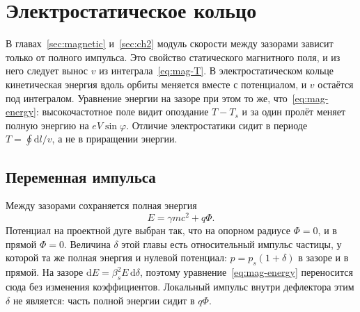 \section{Электростатическое кольцо}
\label{sec:electrostatic}

В главах~\ref{sec:magnetic} и~\ref{sec:ch2} модуль скорости между зазорами зависит только от полного импульса. Это свойство статического магнитного поля, и из него следует вынос $v$ из интеграла~\eqref{eq:mag-T}. В электростатическом кольце кинетическая энергия вдоль орбиты меняется вместе с потенциалом, и $v$ остаётся под интегралом. Уравнение энергии на зазоре при этом то же, что~\eqref{eq:mag-energy}: высокочастотное поле видит опоздание $T-T_s$ и за один пролёт меняет полную энергию на $eV\sin\varphi$. Отличие электростатики сидит в периоде $T=\oint\mathrm{d}l/v$, а не в приращении энергии.

\subsection{Переменная импульса}
\label{sec:es-delta}

Между зазорами сохраняется полная энергия
\begin{equation}
\label{eq:es-energy}
E=\gamma mc^2+q\Phi.
\end{equation}
Потенциал на проектной дуге выбран так, что на опорном радиусе $\Phi=0$, и в прямой $\Phi=0$. Величина $\delta$ этой главы есть относительный импульс частицы, у которой та же полная энергия и нулевой потенциал: $p=p_s(1+\delta)$ в зазоре и в прямой. На зазоре $\mathrm{d}E=\beta_s^2 E\,\mathrm{d}\delta$, поэтому уравнение~\eqref{eq:mag-energy} переносится сюда без изменения коэффициентов. Локальный импульс внутри дефлектора этим $\delta$ не является: часть полной энергии сидит в $q\Phi$.


